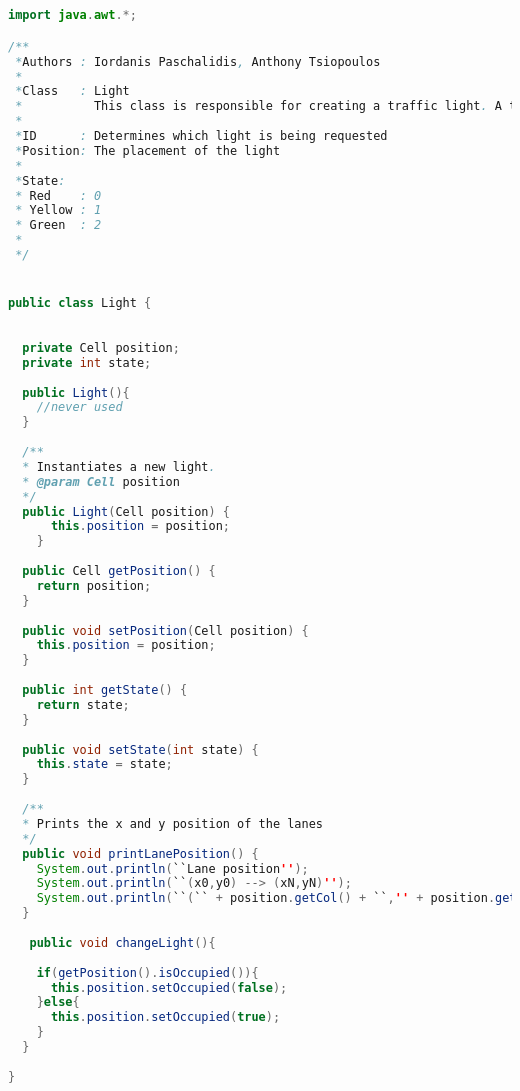 \newpage


\begin{lstlisting}[language=java]


import java.awt.*;

/**
 *Authors : Iordanis Paschalidis, Anthony Tsiopoulos
 *
 *Class   : Light 
 *          This class is responsible for creating a traffic light. A traffic light has a state, a unique Identifier ID and a position.
 *
 *ID      : Determines which light is being requested 
 *Position: The placement of the light 
 *
 *State:
 * Red    : 0
 * Yellow : 1
 * Green  : 2
 * 
 */


public class Light {
  
  
  private Cell position; 
  private int state;
  
  public Light(){
    //never used
  }
  
  /**
  * Instantiates a new light.
  * @param Cell position 
  */
  public Light(Cell position) {
      this.position = position;
    }
  
  public Cell getPosition() {
    return position;
  }
  
  public void setPosition(Cell position) {
    this.position = position;
  }
  
  public int getState() {
    return state;
  }
  
  public void setState(int state) {
    this.state = state;
  }
  
  /**
  * Prints the x and y position of the lanes
  */
  public void printLanePosition() {
    System.out.println(``Lane position'');
    System.out.println(``(x0,y0) --> (xN,yN)'');
    System.out.println(``(`` + position.getCol() + ``,'' + position.getRow() + ``)'');
  }
  
   public void changeLight(){
    
    if(getPosition().isOccupied()){
      this.position.setOccupied(false);
    }else{
      this.position.setOccupied(true);
    }
  }
  
}
\end{lstlisting}
\newpage

